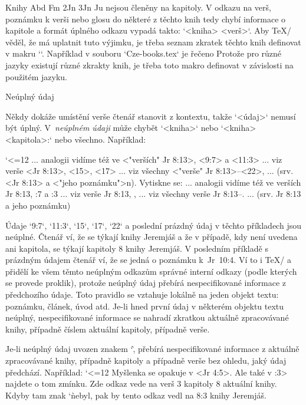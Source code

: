 Knihy Abd Fm 2Jn 3Jn Ju nejsou členěny na kapitoly. V odkazu na verš, poznámku
k verši nebo glosu do některé z těchto knih tedy chybí informace o kapitole
a formát úplného odkazu vypadá takto: `<kniha> <verš>`. Aby \TeX/ věděl, že
má uplatnit tuto výjimku, je třeba seznam zkratek těchto knih definovat v
makru `\nochapbooks`. Například v souboru `Cze-books.tex` je řečeno
\begtt
\def\nochapbooks{Abd Fm 2Jn 3Jn Ju}
\endtt
Protože pro různé jazyky existují různé zkrakty knih, je třeba toto makro
definovat v závislosti na použitém jazyku.

\secc[nudaj] Neúplný údaj

Někdy dokáže umístění verše čtenář stanovit z kontextu, takže `<údaj>`
nemusí být úplný. V~{\em neúplném údaji} může chybět `<kniha>` nebo
`<kniha> <kapitola>:` nebo všechno. Například:

\begtt \catcode`<=12
... analogii vidíme též ve <"verších" Jr 8:13>, <9:7> a <11:3>
... viz verše <Jr 8:13>, <15>, <17>
... viz všechny <"verše" Jr 8:13>--<22>,
... (srv. <Jr 8:13> a <"jeho poznámku">n).
\endtt
Vytiskne se:
... analogii vidíme též ve {\Blue verších Jr 8:13}, {:7} a {:3}
... viz verše {\Blue Jr 8:13}, {}, {}
... viz všechny {\Blue verše Jr 8:13}--{}.
... (srv. {\Blue Jr 8:13} a {\Blue jeho poznámku})

Údaje `9:7`, `11:3`, `15`, `17`, `22` a poslední prázdný údaj
v těchto příkladech jsou neúplné. Čtenář ví, že se týkají
knihy Jeremjáš a že v případě, kdy není uvedena ani kapitola, se týkají kapitoly 8 knihy
Jeremjáš. V posledním příkladě s prázdným údajem čtenář ví, že se jedná o poznámku
k~Jr~10:4. Ví to i \TeX/ a přidělí ke všem těmto neúplným odkazům správné interní
odkazy (podle kterých se provede proklik), protože neúplný údaj přebírá
nespecifikované informace z předchozího údaje. Toto pravidlo se vztahuje
lokálně na jeden objekt textu: poznámku, článek, úvod atd. Je-li hned první údaj v
některém objektu textu neúplný, nespecifikované informace se nahradí
zkratkou aktuálně zpracovávané knihy, případně číslem aktuální kapitoly,
případně verše.

Je-li neúplný údaj uvozen znakem `\`, přebírá nespecifikované informace z
aktuálně zpracovávané knihy, případně kapitoly a případně verše bez ohledu, jaký údaj
předchází. Například:
\begtt \catcode`<=12
 {} Myšlenka se opakuje v <Jr 4:5>. Ale také v :3> najdete o tom zmínku.
\endtt
Zde odkaz {} vede na verš 3 kapitoly 8 aktuální knihy. Kdyby tam
znak `\` nebyl, pak by tento odkaz vedl na 8:3 knihy Jeremjáš.

